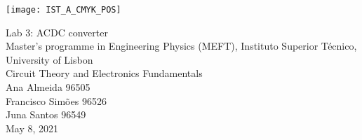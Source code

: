 
\thispagestyle {empty}

\texttt{[image: IST\_A\_CMYK\_POS]}

\begin{center}
%
\vspace{1.0cm}

\vspace{1cm}
{\FontLb Lab 3: ACDC converter} \\ %
\vspace{1cm}
{\FontSn Master’s programme in Engineering Physics (MEFT), Instituto Superior Técnico, University of Lisbon} \\ %
\vspace{0.6cm}
{\FontSn Circuit Theory and Electronics Fundamentals} \\
\vspace{0.6cm}
{\FontSn Ana Almeida 96505 \\ Francisco Simões 96526 \\ Juna Santos 96549} \\
\vspace{1cm}
{\FontSn May 8, 2021} \\ %
%
\end{center}

